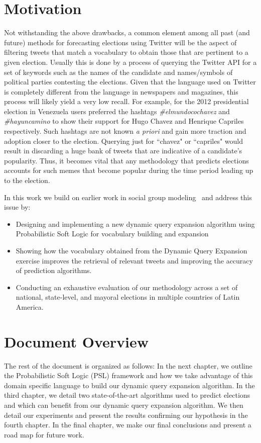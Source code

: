 \section{Motivation}
Not withstanding the above drawbacks, a common element among all past (and future) methods
for forecasting elections using Twitter will be the
aspect of filtering tweets that match a vocabulary to obtain those that are pertinent to a given election.
Usually this is done by a process of querying the Twitter API for a set of keywords such as the names of 
the candidate and names/symbols of political parties contesting the elections.
Given that the language used on Twitter is completely different from the language in newspapers and magazines, this process will likely yield a very low recall.
For example, for the 2012 presidential election in Venezuela users preferred  the hashtags \emph{\#elmundocochavez} and \emph{\#hayuncamino} to show their support for Hugo Chavez and Henrique Capriles respectively.
Such hashtags are not known {\it a priori} and gain more traction and adoption closer to the election.
Querying just for ``chavez" or ``capriles" would result in discarding a huge bank of tweets that are indicative 
of a candidate's popularity.
Thus, it becomes vital that any methodology that predicts elections accounts for such memes that become popular 
during the time period leading up to the election.

In this work we build on earlier work in social group modeling~\cite{huang2012social} and address this issue by:
\begin{itemize}
\item
Designing and implementing a new dynamic query expansion algorithm using Probabilistic Soft Logic for vocabulary
building and expansion
\item
Showing how the vocabulary obtained from the Dynamic Query Expansion exercise improves the retrieval of relevant
tweets and improving the accuracy of prediction algorithms.
\item Conducting an exhaustive evaluation of our methodology across a set of national, state-level, and mayoral
elections in multiple countries of Latin America.
\end{itemize}

\section{Document Overview}
The rest of the document is organized as follows:
In the next chapter, we outline the Probabilistic Soft Logic (PSL) framework and how we take advantage 
of this domain specific language to build our dynamic query expansion algorithm.
In the third chapter, we detail two state-of-the-art algorithms used to predict elections and which can
benefit from our dynamic query expansion algorithm.
We then detail our experiments and present the results confirming our hypothesis in the fourth chapter.
In the final chapter, we make our final conclusions and present a road map for future work.
